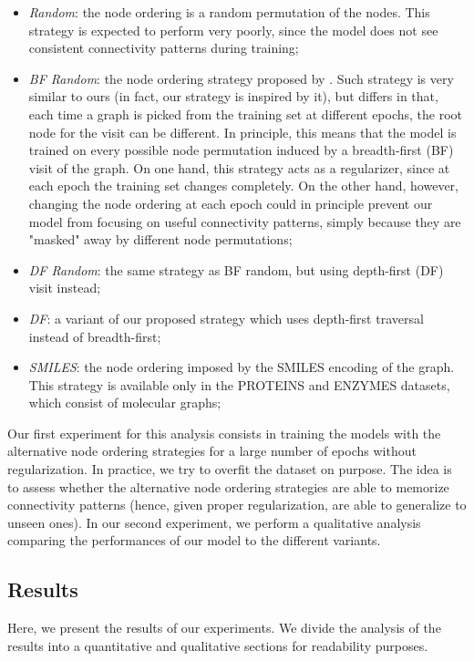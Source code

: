 \begin{itemize}
    \item \emph{Random}: the node ordering is a random permutation of the nodes. This strategy is expected to perform very poorly, since the model does not see consistent connectivity patterns during training;
    \item \emph{BF Random}: the node ordering strategy proposed by \citet{you2018graphrnn}. Such strategy is very similar to ours (in fact, our strategy is inspired by it), but differs in that, each time a graph is picked from the training set at different epochs, the root node for the visit can be different. In principle, this means that the model is trained on every possible node permutation induced by a breadth-first (BF) visit of the graph. On one hand, this strategy acts as a regularizer, since at each epoch the training set changes completely. On the other hand, however, changing the node ordering at each epoch could in principle prevent our model from focusing on useful connectivity patterns, simply because they are "masked" away by different node permutations;
    \item \emph{DF Random}: the same strategy as BF random, but using depth-first (DF) visit instead;
    \item \emph{DF}: a variant of our proposed strategy which uses depth-first traversal instead of breadth-first;
    \item \emph{SMILES}: the node ordering imposed by the SMILES encoding of the graph. This strategy is available only in the PROTEINS and ENZYMES datasets, which consist of molecular graphs;
\end{itemize}
Our first experiment for this analysis consists in training the models with the alternative node ordering strategies for a large number of epochs without regularization. In practice, we try to overfit the dataset on purpose. The idea is to assess whether the alternative node ordering strategies are able to memorize connectivity patterns (hence, given proper regularization, are able to generalize to unseen ones). In our second experiment, we perform a qualitative analysis comparing the performances of our model to the different variants.

\subsection{Results}
Here, we present the results of our experiments. We divide the analysis of the results into a quantitative and qualitative sections for readability purposes.

